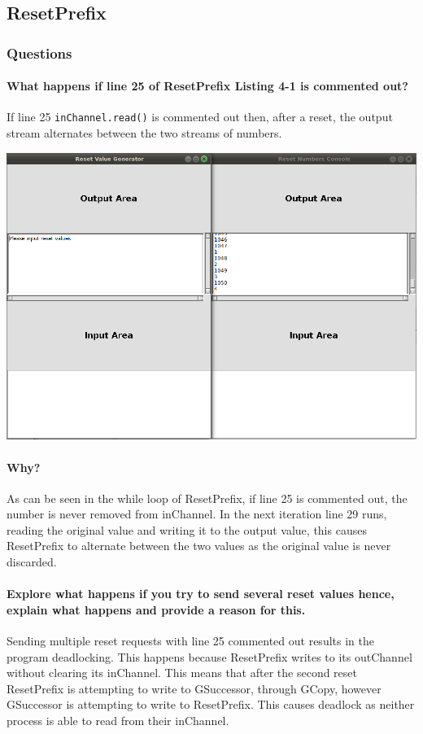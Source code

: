 \subsection{ResetPrefix}

\subsubsection*{Questions}

\paragraph{What happens if line {25} of ResetPrefix Listing 4-1 is commented out?}

If line 25 \texttt{inChannel.read()} is commented out then, after a reset, the output stream alternates between the two streams of numbers.

\includegraphics[width=\textwidth]{img/screenshots/4-1-1.png}

\paragraph{Why?}


As can be seen in the while loop of ResetPrefix, if line 25 is commented out, the number is never removed from inChannel.  In the next iteration line 29 runs, reading the original value and writing it to the output value, this causes ResetPrefix to alternate between the two values as the original value is never discarded.

\paragraph{Explore what happens if you try to send several reset values hence, explain what happens and provide a reason for this.}

Sending multiple reset requests with line 25 commented out results in the program deadlocking.  This happens because ResetPrefix writes to its outChannel without clearing its inChannel.  This means that after the second reset ResetPrefix is attempting to write to GSuccessor, through GCopy, however GSuccessor is attempting to write to ResetPrefix.  This causes deadlock as neither process is able to read from their inChannel.